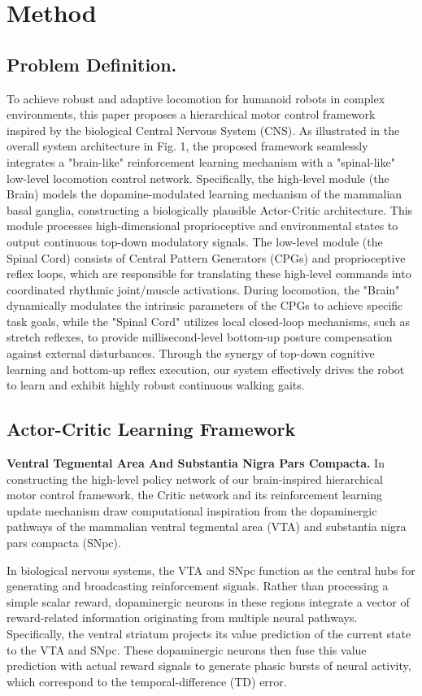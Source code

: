\documentclass[lettersize,journal]{IEEEtran}
\begin{document}
\section{Method}
\subsection{Problem Definition.}
To achieve robust and adaptive locomotion for humanoid robots in complex environments, this paper proposes a hierarchical motor control framework inspired by the biological Central Nervous System (CNS). 
As illustrated in the overall system architecture in Fig. 1, the proposed framework seamlessly integrates a "brain-like" reinforcement learning mechanism with a "spinal-like" low-level locomotion control network. 
Specifically, the high-level module (the Brain) models the dopamine-modulated learning mechanism of the mammalian basal ganglia, constructing a biologically plausible Actor-Critic architecture. 
This module processes high-dimensional proprioceptive and environmental states to output continuous top-down modulatory signals. 
The low-level module (the Spinal Cord) consists of Central Pattern Generators (CPGs) and proprioceptive reflex loops, which are responsible for translating these high-level commands into coordinated rhythmic joint/muscle activations. 
During locomotion, the "Brain" dynamically modulates the intrinsic parameters of the CPGs to achieve specific task goals, while the "Spinal Cord" utilizes local closed-loop mechanisms, such as stretch reflexes, to provide millisecond-level bottom-up posture compensation against external disturbances. 
Through the synergy of top-down cognitive learning and bottom-up reflex execution, our system effectively drives the robot to learn and exhibit highly robust continuous walking gaits.

\subsection{Actor-Critic Learning Framework}

\textbf{Ventral Tegmental Area And Substantia Nigra Pars Compacta.}
In constructing the high-level policy network of our brain-inspired hierarchical motor control framework, the Critic network and its reinforcement learning update mechanism draw computational inspiration from the dopaminergic pathways of the mammalian ventral tegmental area (VTA) and substantia nigra pars compacta (SNpc).

In biological nervous systems, the VTA and SNpc function as the central hubs for generating and broadcasting reinforcement signals. 
Rather than processing a simple scalar reward, dopaminergic neurons in these regions integrate a vector of reward-related information originating from multiple neural pathways. 
Specifically, the ventral striatum projects its value prediction of the current state to the VTA and SNpc. 
These dopaminergic neurons then fuse this value prediction with actual reward signals to generate phasic bursts of neural activity, which correspond to the temporal-difference (TD) error.
\end{document}
